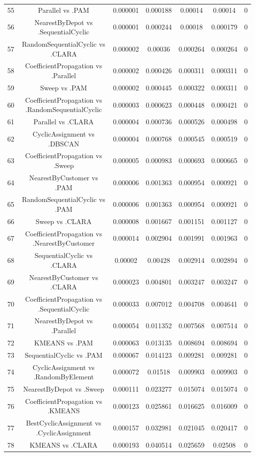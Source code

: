 \documentclass[a4paper,10pt]{article}
\begin{document}
\begin{landscape}
\begin{table}[!htp]
\begin{tabular}{ccccccc}
55&Parallel vs .PAM&0.000001&0.000188&0.00014&0.00014&0\\
56&NearestByDepot vs .SequentialCyclic&0.000001&0.000244&0.00018&0.000179&0\\
57&RandomSequentialCyclic vs .CLARA&0.000002&0.00036&0.000264&0.000264&0\\
58&CoefficientPropagation vs .Parallel&0.000002&0.000426&0.000311&0.000311&0\\
59&Sweep vs .PAM&0.000002&0.000445&0.000322&0.000311&0\\
60&CoefficientPropagation vs .RandomSequentialCyclic&0.000003&0.000623&0.000448&0.000421&0\\
61&Parallel vs .CLARA&0.000004&0.000736&0.000526&0.000498&0\\
62&CyclicAssignment vs .DBSCAN&0.000004&0.000768&0.000545&0.000519&0\\
63&CoefficientPropagation vs .Sweep&0.000005&0.000983&0.000693&0.000665&0\\
64&NearestByCustomer vs .PAM&0.000006&0.001363&0.000954&0.000921&0\\
65&RandomSequentialCyclic vs .PAM&0.000006&0.001363&0.000954&0.000921&0\\
66&Sweep vs .CLARA&0.000008&0.001667&0.001151&0.001127&0\\
67&CoefficientPropagation vs .NearestByCustomer&0.000014&0.002904&0.001991&0.001963&0\\
68&SequentialCyclic vs .CLARA&0.00002&0.00428&0.002914&0.002894&0\\
69&NearestByCustomer vs .CLARA&0.000023&0.004801&0.003247&0.003247&0\\
70&CoefficientPropagation vs .SequentialCyclic&0.000033&0.007012&0.004708&0.004641&0\\
71&NearestByDepot vs .Parallel&0.000054&0.011352&0.007568&0.007514&0\\
72&KMEANS vs .PAM&0.000063&0.013135&0.008694&0.008694&0\\
73&SequentialCyclic vs .PAM&0.000067&0.014123&0.009281&0.009281&0\\
74&CyclicAssignment vs .RandomByElement&0.000072&0.01518&0.009903&0.009903&0\\
75&NearestByDepot vs .Sweep&0.000111&0.023277&0.015074&0.015074&0\\
76&CoefficientPropagation vs .KMEANS&0.000123&0.025861&0.016625&0.016009&0\\
77&BestCyclicAssignment vs .CyclicAssignment&0.000157&0.032981&0.021045&0.020417&0\\
78&KMEANS vs .CLARA&0.000193&0.040514&0.025659&0.02508&0\\

\end{tabular}
\end{table}
\end{landscape}
\end{document}
